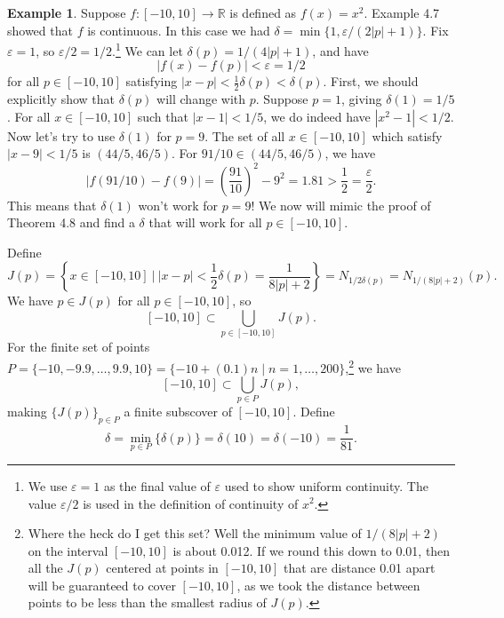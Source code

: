 \documentclass{article}
\newcommand{\R}{\mathbb{R}}
\theoremstyle{definition}
\newtheorem{example}{Example}[section]
\begin{document}
	\begin{example}
		Suppose $ f:[-10,10]\to\R $ is defined as $ f(x)=x^2 $. Example 4.7 showed that $ f $ is continuous. In this case we had $ \delta=\min\{1,\varepsilon/(2|p|+1)\} $. Fix $ \varepsilon=1 $, so $ \varepsilon/2=1/2 $.\footnote{We use $ \varepsilon=1 $ as the final value of $ \varepsilon $ used to show uniform continuity. The value $ \varepsilon/2 $ is used in the definition of continuity of $ x^2 $.} We can let $ \delta(p)=1/(4|p|+1) $, and have $$|f(x)-f(p)|<\varepsilon=1/2 $$ for all $ p\in [-10,10] $ satisfying $ |x-p|<\frac{1}{2}\delta(p)<\delta(p) $. First, we should explicitly show that $ \delta(p) $ will change with $ p $. Suppose $ p=1 $, giving $ \delta(1)=1/5 $. For all $ x\in[-10,10] $ such that $ |x-1|<1/5 $, we do indeed have $ |x^2-1|<1/2 $. Now let's try to use $ \delta(1) $ for $ p=9 $. The set of all $ x\in[-10,10] $ which satisfy $ |x-9|<1/5 $ is $ (44/5,46/5) $. For $ 91/10\in(44/5,46/5) $, we have $$ |f(91/10)-f(9)|=\left(\frac{91}{10}\right)^2-9^2=1.81>\frac{1}{2}=\frac{\varepsilon}{2}.$$ This means that $ \delta(1) $ won't work for $ p=9 $! We now will mimic the proof of Theorem 4.8 and find a $ \delta $ that will work for all $ p\in[-10,10] $. 
		
		Define $$J(p)=\left\{x\in[-10,10]\ \Big|\  |x-p|<\frac{1}{2}\delta(p)=\frac{1}{8|p|+2}\right\}=N_{1/2\delta(p)}=N_{1/(8|p|+2)}(p). $$ We have $ p\in J(p) $ for all $ p\in[-10,10] $, so $$ [-10,10]\subset\bigcup_{p\in [-10,10]}J(p) .$$ For the finite set of points $ P=\{-10,-9.9,\ldots,9.9,10\}=\{-10+(0.1)n\mid n=1,\ldots, 200\} $,\footnote{Where the heck do I get this set? Well the minimum value of $ 1/(8|p|+2) $ on the interval $ [-10,10] $ is about 0.012. If we round this down to 0.01, then all the $ J(p) $ centered at points in $ [-10,10] $ that are distance 0.01 apart will be guaranteed to cover $ [-10,10] $, as we took the distance between points to be less than the smallest radius of $ J(p) $. } we have $$ [-10,10]\subset\bigcup_{p\in P}J(p) ,$$ making $ \{J(p)\}_{p\in P} $ a finite subscover of $ [-10,10] $. Define $$ \delta=\min\limits_{p\in P}\{\delta(p)\}=\delta(10)=\delta(-10)=\frac{1}{81} .$$
		

\end{example}
\end{document}
